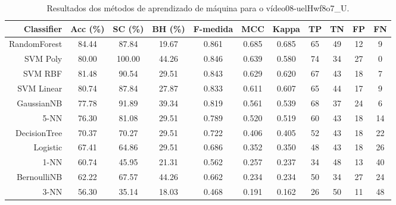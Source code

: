 \begin{table}[!htb]
\centering
\caption{Resultados dos métodos de aprendizado de máquina para o vídeo08-uelHwf8o7_U.}
\label{tab:08-uelHwf8o7_U}
\begin{tabular}{r|c|c|c|c|c|c|c|c|c|c}
\hline\hline
Classifier & Acc (\%) & SC (\%) & BH (\%) & F-medida & MCC & Kappa & TP & TN & FP & FN \\ \hline
RandomForest & 84.44 & 87.84 & 19.67 & 0.861 & 0.685 & 0.685 & 65 & 49 & 12 & 9 \\ 
SVM Poly & 80.00 & 100.00 & 44.26 & 0.846 & 0.639 & 0.580 & 74 & 34 & 27 & 0 \\ 
SVM RBF & 81.48 & 90.54 & 29.51 & 0.843 & 0.629 & 0.620 & 67 & 43 & 18 & 7 \\ 
SVM Linear & 80.74 & 87.84 & 27.87 & 0.833 & 0.611 & 0.607 & 65 & 44 & 17 & 9 \\ 
GaussianNB & 77.78 & 91.89 & 39.34 & 0.819 & 0.561 & 0.539 & 68 & 37 & 24 & 6 \\ 
5-NN & 76.30 & 81.08 & 29.51 & 0.789 & 0.520 & 0.519 & 60 & 43 & 18 & 14 \\ 
DecisionTree & 70.37 & 70.27 & 29.51 & 0.722 & 0.406 & 0.405 & 52 & 43 & 18 & 22 \\ 
Logistic & 67.41 & 64.86 & 29.51 & 0.686 & 0.352 & 0.350 & 48 & 43 & 18 & 26 \\ 
1-NN & 60.74 & 45.95 & 21.31 & 0.562 & 0.257 & 0.237 & 34 & 48 & 13 & 40 \\ 
BernoulliNB & 62.22 & 67.57 & 44.26 & 0.662 & 0.234 & 0.234 & 50 & 34 & 27 & 24 \\ 
3-NN & 56.30 & 35.14 & 18.03 & 0.468 & 0.191 & 0.162 & 26 & 50 & 11 & 48 \\ 
\hline\hline
\end{tabular}
\end{table}

